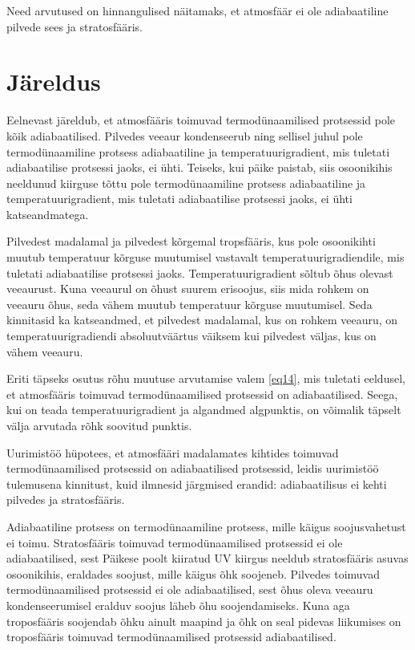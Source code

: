 \documentclass{trkut}%
\begin{document}
Need arvutused on hinnangulised näitamaks, et atmosfäär ei ole adiabaatiline pilvede sees ja stratosfääris.


\section{Järeldus}
Eelnevast järeldub, et atmosfääris toimuvad termodünaamilised protsessid pole kõik adiabaatilised. Pilvedes veeaur kondenseerub ning sellisel juhul pole termodünaamiline protsess adiabaatiline ja temperatuurigradient, mis tuletati adiabaatilise protsessi jaoks, ei ühti. Teiseks, kui päike paistab, siis osoonikihis neeldunud kiirguse tõttu pole termodünaamiline protsess adiabaatiline ja temperatuurigradient, mis tuletati adiabaatilise protsessi jaoks, ei ühti katseandmatega.

Pilvedest madalamal ja pilvedest kõrgemal tropsfääris, kus pole osoonikihti muutub temperatuur kõrguse muutumisel vastavalt temperatuurigradiendile, mis tuletati adiabaatilise protsessi jaoks. Temperatuurigradient sõltub õhus olevast veeaurust. Kuna veeaurul on õhust suurem erisoojus, siis mida rohkem on veeauru õhus, seda vähem muutub temperatuur kõrguse muutumisel. Seda kinnitasid ka katseandmed, et pilvedest madalamal, kus on rohkem veeauru, on temperatuurigradiendi absoluutväärtus väiksem kui pilvedest väljas, kus on vähem veeauru.

Eriti täpseks osutus rõhu muutuse arvutamise valem \ref{eq14}, mis tuletati eeldusel, et atmosfääris toimuvad termodünaamilised protsessid on adiabaatilised. Seega, kui on teada temperatuurigradient ja algandmed algpunktis, on võimalik täpselt välja arvutada rõhk soovitud punktis.


Uurimistöö hüpotees, et atmosfääri madalamates kihtides toimuvad termodünaamilised protsessid on adiabaatilised protsessid, leidis uurimistöö tulemusena kinnitust, kuid ilmnesid järgmised erandid: adiabaatilisus ei kehti pilvedes ja stratosfääris. 

Adiabaatiline protsess on termodünaamiline protsess, mille käigus soojusvahetust ei toimu. Stratosfääris toimuvad termodünaamilised protsessid ei ole adiabaatilised, sest Päikese poolt kiiratud UV kiirgus neeldub stratosfääris asuvas osoonikihis, eraldades soojust, mille käigus õhk soojeneb. Pilvedes toimuvad termodünaamilised protsessid ei ole adiabaatilised, sest õhus oleva veeauru kondenseerumisel eralduv soojus läheb õhu soojendamiseks. Kuna aga troposfääris soojendab õhku ainult maapind ja õhk on seal pidevas liikumises on troposfääris toimuvad termodünaamilised protsessid adiabaatilised.
\end{document}
